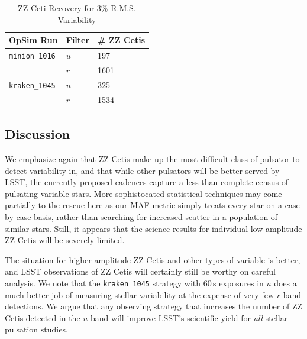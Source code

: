 \begin{table}[h]
\begin{center}
    \caption{ZZ Ceti Recovery for 3\% R.M.S. Variability}\label{tab:zz3pertab}
    \begin{tabular}{| l | l | l |}
    \hline
    OpSim Run & Filter & \# ZZ Cetis \\ \hline
     {\tt minion\_1016} & $u$ & 197  \\ 
      & $r$ & 1601 \\ \hline
    {\tt kraken\_1045}  & $u$ & 325\\
    & $r$ & 1534  \\ \hline
    \end{tabular}
\end{center}
\end{table}



\subsection{Discussion}
\label{sec:\secname:discussion}

We emphasize again that ZZ Cetis make up the most difficult class of pulsator to detect variability in, and that while other pulsators will be better served by LSST, the currently proposed cadences capture a less-than-complete census of pulsating variable stars.  More sophistocated statistical techniques may come partially to the rescue here as our MAF metric simply treats every star on a case-by-case basis, rather than searching for increased scatter in a population of similar stars.  Still, it appears that the science results for individual low-amplitude ZZ Cetis will be severely limited.

The situation for higher amplitude ZZ Cetis and other types of variable is better, and LSST observations of ZZ Cetis will certainly still be worthy on careful analysis.  We note that the {\tt kraken\_1045} strategy with 60\,s exposures in $u$ does a much better job of measuring stellar variability at the expense of very few $r$-band detections.  We argue that any observing strategy that increases the number of ZZ Cetis detected in the $u$ band will improve LSST's scientific yield for \emph{all} stellar pulsation studies.



\navigationbar

